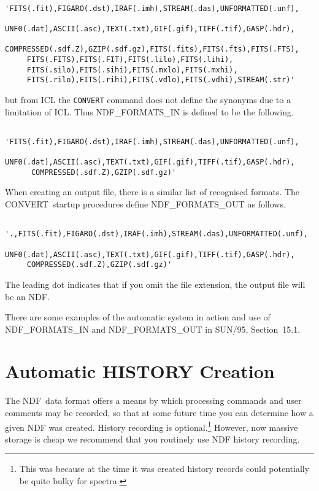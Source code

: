 \documentclass[twoside,11pt]{article}
\newcommand{\xref}[3]{#1}
\newcommand{\xlabel}[1]{}
\newcommand{\latexelsehtml}[2]{#1}
\newcommand{\latexelsehtml}[2]{#2}
\newcommand{\CONVERT}{{\footnotesize CONVERT}}
\begin{document}
\small
\begin{verbatim}
     'FITS(.fit),FIGARO(.dst),IRAF(.imh),STREAM(.das),UNFORMATTED(.unf),
     UNF0(.dat),ASCII(.asc),TEXT(.txt),GIF(.gif),TIFF(.tif),GASP(.hdr),
     COMPRESSED(.sdf.Z),GZIP(.sdf.gz),FITS(.fits),FITS(.fts),FITS(.FTS),
     FITS(.FITS),FITS(.FIT),FITS(.lilo),FITS(.lihi),
     FITS(.silo),FITS(.sihi),FITS(.mxlo),FITS(.mxhi),
     FITS(.rilo),FITS(.rihi),FITS(.vdlo),FITS(.vdhi),STREAM(.str)'
\end{verbatim}
\normalsize

but from ICL the \texttt{CONVERT} command does not define the synonyms due 
to a limitation of ICL.  Thus NDF\_FORMATS\_IN is defined to be the
following. 

\small
\begin{verbatim}
     'FITS(.fit),FIGARO(.dst),IRAF(.imh),STREAM(.das),UNFORMATTED(.unf),
      UNF0(.dat),ASCII(.asc),TEXT(.txt),GIF(.gif),TIFF(.tif),GASP(.hdr),
      COMPRESSED(.sdf.Z),GZIP(.sdf.gz)'
\end{verbatim}
\normalsize

When creating an output file, there is a similar list of recognised
formats.  The \CONVERT\ startup procedures define NDF\_FORMATS\_OUT
as follows.

\small
\begin{verbatim}
     '.,FITS(.fit),FIGARO(.dst),IRAF(.imh),STREAM(.das),UNFORMATTED(.unf),
     UNF0(.dat),ASCII(.asc),TEXT(.txt),GIF(.gif),TIFF(.tif),GASP(.hdr),
     COMPRESSED(.sdf.Z),GZIP(.sdf.gz)'
\end{verbatim}
\normalsize

The leading dot indicates that if you omit the file extension, the
output file will be an NDF.

There are some examples of the automatic system in action and use of
NDF\_FORMATS\_IN and NDF\_FORMATS\_OUT in
\latexelsehtml{SUN/95, Section~15.1.}{\xref{Automatic
Conversion.}{sun95}{se_autoconvert}}


\section{\label{sect_history}\xlabel{sect_history}Automatic HISTORY
Creation}

The \xref{NDF}{sun33}{the_history_component}\ data format offers a
means by which processing commands and user comments may be recorded,
so that at some future time you can determine how a given NDF was
created.  History recording is optional.\footnote{This was because at
the time it was created history records could potentially be quite bulky 
for spectra.} However, now massive storage is cheap we recommend that 
you routinely use NDF history recording.
\end{document}
